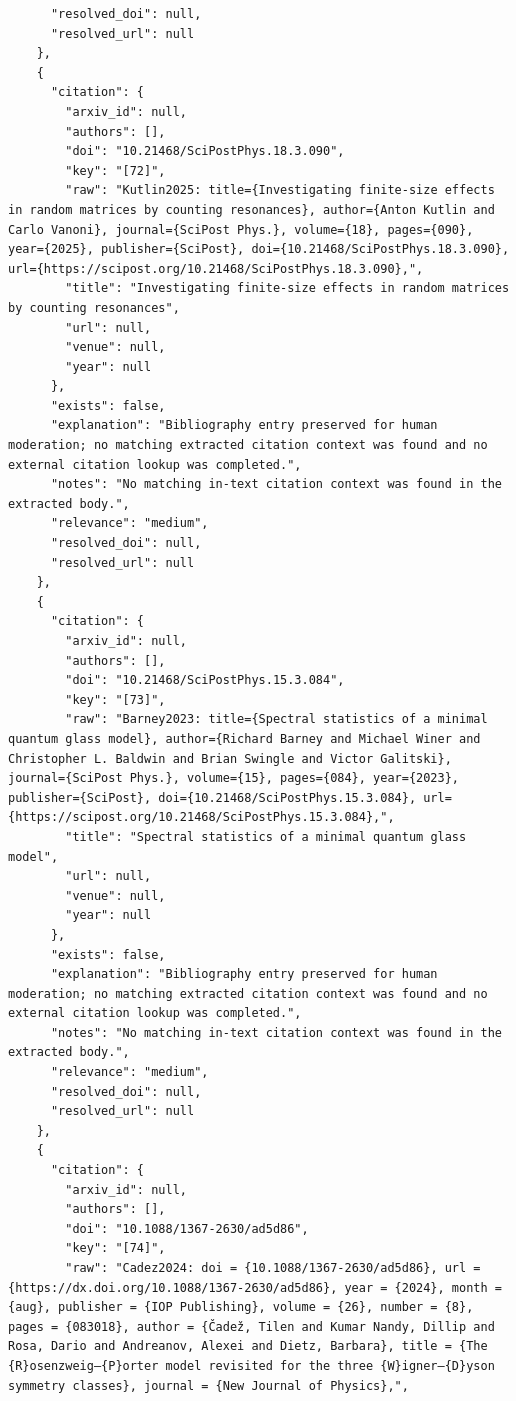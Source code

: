 \documentclass[11pt]{article}
\begin{document}
\begin{verbatim}
      "resolved_doi": null,
      "resolved_url": null
    },
    {
      "citation": {
        "arxiv_id": null,
        "authors": [],
        "doi": "10.21468/SciPostPhys.18.3.090",
        "key": "[72]",
        "raw": "Kutlin2025: title={Investigating finite-size effects in random matrices by counting resonances}, author={Anton Kutlin and Carlo Vanoni}, journal={SciPost Phys.}, volume={18}, pages={090}, year={2025}, publisher={SciPost}, doi={10.21468/SciPostPhys.18.3.090}, url={https://scipost.org/10.21468/SciPostPhys.18.3.090},",
        "title": "Investigating finite-size effects in random matrices by counting resonances",
        "url": null,
        "venue": null,
        "year": null
      },
      "exists": false,
      "explanation": "Bibliography entry preserved for human moderation; no matching extracted citation context was found and no external citation lookup was completed.",
      "notes": "No matching in-text citation context was found in the extracted body.",
      "relevance": "medium",
      "resolved_doi": null,
      "resolved_url": null
    },
    {
      "citation": {
        "arxiv_id": null,
        "authors": [],
        "doi": "10.21468/SciPostPhys.15.3.084",
        "key": "[73]",
        "raw": "Barney2023: title={Spectral statistics of a minimal quantum glass model}, author={Richard Barney and Michael Winer and Christopher L. Baldwin and Brian Swingle and Victor Galitski}, journal={SciPost Phys.}, volume={15}, pages={084}, year={2023}, publisher={SciPost}, doi={10.21468/SciPostPhys.15.3.084}, url={https://scipost.org/10.21468/SciPostPhys.15.3.084},",
        "title": "Spectral statistics of a minimal quantum glass model",
        "url": null,
        "venue": null,
        "year": null
      },
      "exists": false,
      "explanation": "Bibliography entry preserved for human moderation; no matching extracted citation context was found and no external citation lookup was completed.",
      "notes": "No matching in-text citation context was found in the extracted body.",
      "relevance": "medium",
      "resolved_doi": null,
      "resolved_url": null
    },
    {
      "citation": {
        "arxiv_id": null,
        "authors": [],
        "doi": "10.1088/1367-2630/ad5d86",
        "key": "[74]",
        "raw": "Cadez2024: doi = {10.1088/1367-2630/ad5d86}, url = {https://dx.doi.org/10.1088/1367-2630/ad5d86}, year = {2024}, month = {aug}, publisher = {IOP Publishing}, volume = {26}, number = {8}, pages = {083018}, author = {Čadež, Tilen and Kumar Nandy, Dillip and Rosa, Dario and Andreanov, Alexei and Dietz, Barbara}, title = {The {R}osenzweig–{P}orter model revisited for the three {W}igner–{D}yson symmetry classes}, journal = {New Journal of Physics},",

\end{verbatim}
\end{document}
